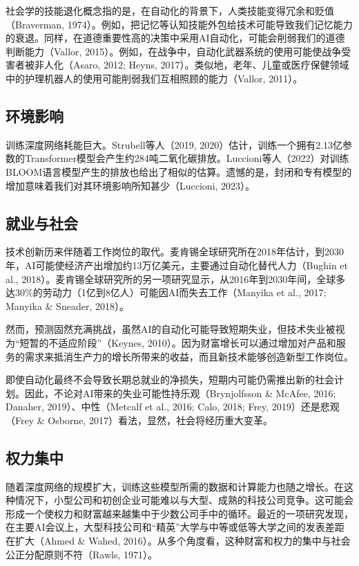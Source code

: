 \documentclass[lang=cn,newtx,10pt,scheme=chinese]{elegantbook}
\begin{document}
社会学的技能退化概念指的是，在自动化的背景下，人类技能变得冗余和贬值（Braverman, 1974）。例如，把记忆等认知技能外包给技术可能导致我们记忆能力的衰退。同样，在道德重要性高的决策中采用AI自动化，可能会削弱我们的道德判断能力（Vallor, 2015）。例如，在战争中，自动化武器系统的使用可能使战争受害者被非人化（Asaro, 2012; Heyns, 2017）。类似地，老年、儿童或医疗保健领域中的护理机器人的使用可能削弱我们互相照顾的能力（Vallor, 2011）。

\subsection{环境影响}
训练深度网络耗能巨大。Strubell等人（2019, 2020）估计，训练一个拥有2.13亿参数的Transformer模型会产生约284吨二氧化碳排放。Luccioni等人（2022）对训练BLOOM语言模型产生的排放也给出了相似的估算。遗憾的是，封闭和专有模型的增加意味着我们对其环境影响所知甚少（Luccioni, 2023）。

\subsection{就业与社会}
技术创新历来伴随着工作岗位的取代。麦肯锡全球研究所在2018年估计，到2030年，AI可能使经济产出增加约13万亿美元，主要通过自动化替代人力（Bughin et al., 2018）。麦肯锡全球研究所的另一项研究显示，从2016年到2030年间，全球多达30\%的劳动力（1亿到8亿人）可能因AI而失去工作（Manyika et al., 2017; Manyika \& Sneader, 2018）。

然而，预测固然充满挑战，虽然AI的自动化可能导致短期失业，但技术失业被视为“短暂的不适应阶段”（Keynes, 2010）。因为财富增长可以通过增加对产品和服务的需求来抵消生产力的增长所带来的收益，而且新技术能够创造新型工作岗位。

即使自动化最终不会导致长期总就业的净损失，短期内可能仍需推出新的社会计划。因此，不论对AI带来的失业可能性持乐观（Brynjolfsson \& McAfee, 2016; Danaher, 2019）、中性（Metcalf et al., 2016; Calo, 2018; Frey, 2019）还是悲观（Frey \& Osborne, 2017）看法，显然，社会将经历重大变革。

\subsection{权力集中}
随着深度网络的规模扩大，训练这些模型所需的数据和计算能力也随之增长。在这种情况下，小型公司和初创企业可能难以与大型、成熟的科技公司竞争。这可能会形成一个使权力和财富越来越集中于少数公司手中的循环。最近的一项研究发现，在主要AI会议上，大型科技公司和“精英”大学与中等或低等大学之间的发表差距在扩大（Ahmed \& Wahed, 2016）。从多个角度看，这种财富和权力的集中与社会公正分配原则不符（Rawls, 1971）。
\end{document}
